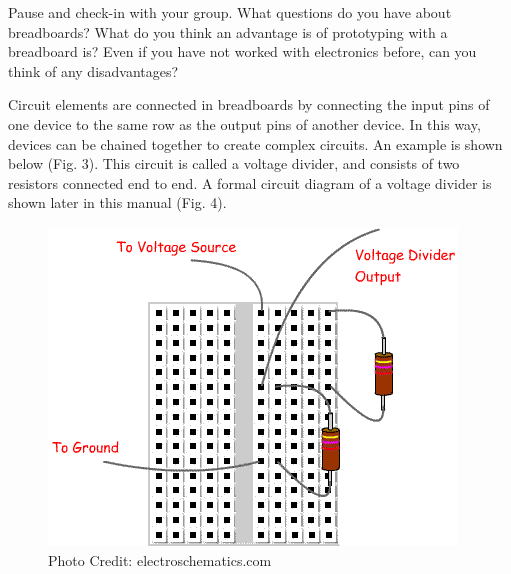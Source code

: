 \documentclass[12pt]{article}
\begin{document}
Pause and check-in with your group. What questions do you have about
breadboards? What do you think an advantage is of prototyping with a
breadboard is? Even if you have not worked with electronics before,
can you think of any disadvantages?


Circuit elements are connected in breadboards by connecting the input
pins of one device to the same row as the output pins of another
device. In this way, devices can be chained together to create complex
circuits. An example is shown below (Fig. 3). This circuit is called a
voltage divider, and consists of two resistors connected end to end. A
formal circuit diagram of a voltage divider is shown later in this
manual (Fig. 4).
	
\begin{figure}[h]
  \begin{center}
    \includegraphics[width=\linewidth]{Figures/voltagedivider.png}
    \caption{Photo Credit: electroschematics.com}
  \end{center}
\end{figure}
	
\end{document}
